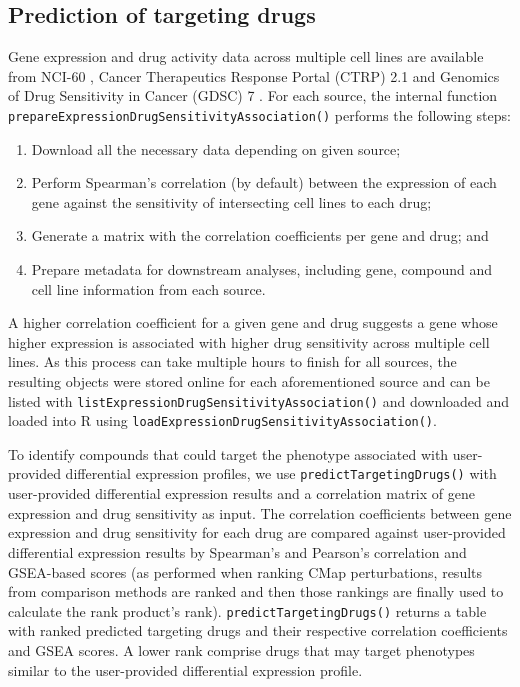 \subsection{Prediction of targeting drugs}

Gene expression and drug activity data across multiple cell lines are available from NCI-60 \cite{shoemaker:2006wi}, Cancer Therapeutics Response Portal (CTRP) 2.1 \cite{seashore-ludlow:2015ws} and Genomics of Drug Sensitivity in Cancer (GDSC) 7 \cite{yang:2012vk}. For each source, the internal function \texttt{prepareExpressionDrugSensitivityAssociation()} performs the following steps:

\begin{enumerate}
	\item Download all the necessary data depending on given source;
	\item Perform Spearman’s correlation (by default) between the expression of each gene against the sensitivity of intersecting cell lines to each drug;
	\item Generate a matrix with the correlation coefficients per gene and drug; and
	\item Prepare metadata for downstream analyses, including gene, compound and cell line information from each source.
\end{enumerate}

A higher correlation coefficient for a given gene and drug suggests a gene whose higher expression is associated with higher drug sensitivity across multiple cell lines. As this process can take multiple hours to finish for all sources, the resulting objects were stored online for each aforementioned source and can be listed with \texttt{listExpressionDrugSensitivityAssociation()} and downloaded and loaded into R using \texttt{loadExpressionDrugSensitivityAssociation()}.

To identify compounds that could target the phenotype associated with user-provided differential expression profiles, we use \texttt{predictTargetingDrugs()} with user-provided differential expression results and a correlation matrix of gene expression and drug sensitivity as input. The correlation coefficients between gene expression and drug sensitivity for each drug are compared against user-provided differential expression results by Spearman’s and Pearson’s correlation and GSEA-based scores (as performed when ranking CMap perturbations, results from comparison methods are ranked and then those rankings are finally used to calculate the rank product’s rank). \texttt{predictTargetingDrugs()} returns a table with ranked predicted targeting drugs and their respective correlation coefficients and GSEA scores. A lower rank comprise drugs that may target phenotypes similar to the user-provided differential expression profile.

